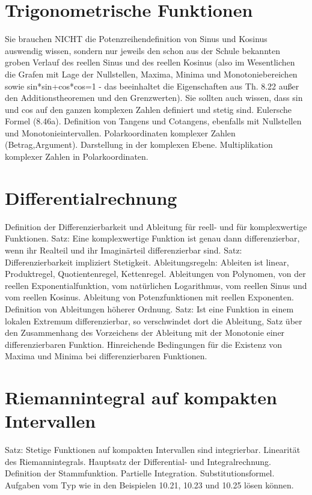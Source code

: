 \documentclass[10pt,a4paper,twoside]{article}
\begin{document}
\section{Trigonometrische Funktionen}
 
Sie brauchen NICHT die Potenzreihendefinition von Sinus und Kosinus auswendig wissen, sondern nur jeweils den schon aus der Schule bekannten groben Verlauf des reellen Sinus und des reellen Kosinus (also im Wesentlichen die Grafen mit Lage der Nullstellen, Maxima, Minima und Monotoniebereichen sowie sin*sin+cos*cos=1 - das beeinhaltet die Eigenschaften aus Th. 8.22 außer den Additionstheoremen und den Grenzwerten). Sie sollten auch wissen, dass sin und cos auf den ganzen komplexen Zahlen definiert und stetig sind. Eulersche Formel (8.46a). Definition von Tangens und Cotangens, ebenfalls mit Nullstellen und Monotonieintervallen. Polarkoordinaten komplexer Zahlen (Betrag,Argument). Darstellung in der komplexen Ebene. Multiplikation komplexer Zahlen in Polarkoordinaten. 

\section{Differentialrechnung}
 
Definition der Differenzierbarkeit und Ableitung für reell- und für komplexwertige Funktionen. Satz: Eine komplexwertige Funktion ist genau dann differenzierbar, wenn ihr Realteil und ihr Imaginärteil differenzierbar sind. Satz: Differenzierbarkeit impliziert Stetigkeit. Ableitungsregeln: Ableiten ist linear, Produktregel, Quotientenregel, Kettenregel. Ableitungen von Polynomen, von der reellen Exponentialfunktion, vom natürlichen Logarithmus, vom reellen Sinus und vom reellen Kosinus. Ableitung von Potenzfunktionen mit reellen Exponenten. Definition von Ableitungen höherer Ordnung. Satz: Ist eine Funktion in einem lokalen Extremum differenzierbar, so verschwindet dort die Ableitung, Satz über den Zusammenhang des Vorzeichens der Ableitung mit der Monotonie einer differenzierbaren Funktion. Hinreichende Bedingungen für die Existenz von Maxima und Minima bei differenzierbaren Funktionen. 

\section{Riemannintegral auf kompakten Intervallen}
 
Satz: Stetige Funktionen auf kompakten Intervallen sind integrierbar. Linearität des Riemannintegrals. Hauptsatz der Differential- und Integralrechnung. Definition der Stammfunktion. Partielle Integration. Substitutionsformel. Aufgaben vom Typ wie in den Beispielen 10.21, 10.23 und 10.25 lösen können.
\end{document}
